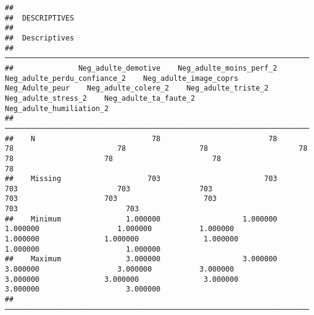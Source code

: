 \documentclass[
]{article}
\begin{document}
\begin{verbatim}
## 
##  DESCRIPTIVES
## 
##  Descriptives                                                                                                                                                                                                                                                         
##  ──────────────────────────────────────────────────────────────────────────────────────────────────────────────────────────────────────────────────────────────────────────────────────────────────────────────────────────────────────────────────────────────────── 
##               Neg_adulte_demotive    Neg_adulte_moins_perf_2    Neg_adulte_perdu_confiance_2    Neg_adulte_image_coprs    Neg_Adulte_peur    Neg_adulte_colere_2    Neg_adulte_triste_2    Neg_adulte_stress_2    Neg_adulte_ta_faute_2    Neg_adulte_humiliation_2   
##  ──────────────────────────────────────────────────────────────────────────────────────────────────────────────────────────────────────────────────────────────────────────────────────────────────────────────────────────────────────────────────────────────────── 
##    N                           78                         78                              78                        78                 78                     78                     78                     78                       78                          78   
##    Missing                    703                        703                             703                       703                703                    703                    703                    703                      703                         703   
##    Minimum               1.000000                   1.000000                        1.000000                  1.000000           1.000000               1.000000               1.000000               1.000000                 1.000000                    1.000000   
##    Maximum               3.000000                   3.000000                        3.000000                  3.000000           3.000000               3.000000               3.000000               3.000000                 3.000000                    3.000000   
##  ────────────────────────────────────────────────────────────────────────────────────────────────────────────────────────────────────────────────────────────────────────────────────────────────────────────────────────────────────────────────────────────────────
\end{verbatim}
\end{document}

